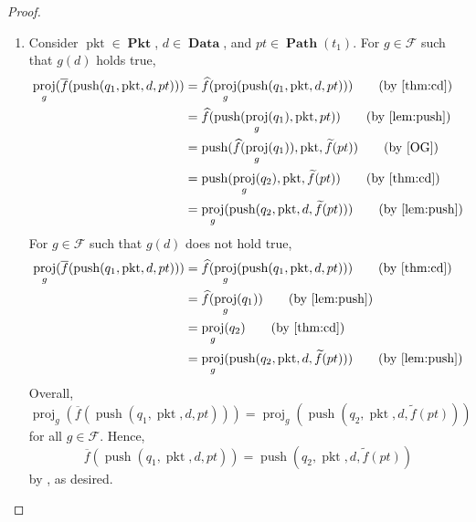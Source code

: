 \documentclass{amsart}
\makeatletter
\DeclareMathOperator{\pkt}{\mathrm{pkt}}
\DeclareMathOperator{\push}{\mathrm{push}}
\DeclareMathOperator{\proj}{\mathrm{proj}}
\DeclareMathOperator{\Pkt}{\mathbf{Pkt}}
\DeclareMathOperator{\Data}{\mathbf{Data}}
\DeclareMathOperator{\Path}{\mathbf{Path}}
\theoremstyle{definition}
\newcommand{\leqnomode}{\tagsleft@true}
\makeatother
\begin{document}
\begin{proof}
\begin{enumerate}
        \leqnomode

        \item Consider $\pkt \in \Pkt$, $d \in \Data$, and $pt \in \Path(t_1)$.
            For $g \in \mathcal F$ such that $g(d)$ holds true,
            \begin{align*}
                \proj_g(\overline{f}(\push(q_1, \pkt, d, pt)))
                &= \widehat{f}(\proj_g(\push(q_1, \pkt, d, pt))) \tag{by \Cref{thm:cd}}\\
                &= \widehat{f}(\push(\proj_g(q_1), \pkt, pt)) \tag{by \Cref{lem:push}}\\
                &= \push(\widehat{f}(\proj_g(q_1)), \pkt, \widetilde{f}(pt)) \tag{by \cite[Lemma ~5.9]{OG}}\\
                &= \push(\proj_g(q_2), \pkt, \widetilde{f}(pt)) \tag{by \Cref{thm:cd}}\\
                &= \proj_g(\push(q_2, \pkt, d, \widetilde{f}(pt))) \tag{by \Cref{lem:push}}
            \end{align*}
            For $g \in \mathcal F$ such that $g(d)$ does not hold true,
            \begin{align*}
                \proj_g(\overline{f}(\push(q_1, \pkt, d, pt)))
                &= \widehat{f}(\proj_g(\push(q_1, \pkt, d, pt))) \tag{by \Cref{thm:cd}}\\
                &= \widehat{f}(\proj_g(q_1)) \tag{by \Cref{lem:push}}\\
                &= \proj_g(q_2) \tag{by \Cref{thm:cd}}\\
                &= \proj_g(\push(q_2, \pkt, d, \widetilde{f}(pt))) \tag{by \Cref{lem:push}}
            \end{align*}
            Overall,
            $
                \proj_g(\overline{f}(\push(q_1, \pkt, d, pt)))
                = 
                \proj_g(\push(q_2, \pkt, d, \widetilde{f}(pt)))
            $
            for all $g \in \mathcal F$. 
            Hence,
            $$
                \overline{f}(\push(q_1, \pkt, d, pt))
                = 
                \push(q_2, \pkt, d, \widetilde{f}(pt))
            $$
            by , as desired.
    \end{enumerate}
\end{proof}

\newpage 

\renewcommand\refname{\LARGE References}


\end{document}
